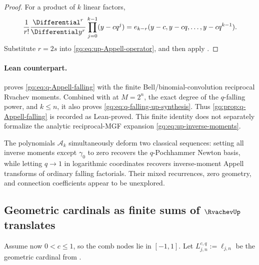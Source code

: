 \begin{proof}
For a product of $k$ linear factors,
\[
 \frac1{r!}\frac{\Differential^r}{\Differential y^r}
 \prod_{j=0}^{k-1}(y-cq^j)
 =e_{k-r}(y-c,y-cq,\ldots,y-cq^{k-1}).
\]
Substitute $r=2s$ into \eqref{gq:eq:up-Appell-operator}, and then apply
.
\end{proof}

\paragraph{Lean counterpart.}
 proves
\eqref{gq:eq:q-Appell-falling} with the finite Bell/binomial-convolution
reciprocal Rvachev moments.  Combined with
at $M=2^n$, the exact degree of the $q$-falling power, and $k\le n$, it also
proves \eqref{gq:eq:q-falling-up-synthesis}.  Thus
\cref{gq:prop:q-Appell-falling} is recorded as Lean-proved.  This finite
identity does not separately formalize the analytic reciprocal-MGF expansion
\eqref{gq:eq:up-inverse-moments}.

The polynomials $\mathscr A_k$ simultaneously deform two classical
sequences: setting all inverse moments except $\gamma_0$ to zero recovers the
$q$-Pochhammer Newton basis, while letting $q\to1$ in logarithmic coordinates
recovers inverse-moment Appell transforms of ordinary falling factorials.
Their mixed recurrences, zero geometry, and connection coefficients appear
to be unexplored.

\subsection{Geometric cardinals as finite sums of \texorpdfstring{$\RvachevUp$}{up} translates}
\label{gq:sec:geometric-cardinal-up}

Assume now $0<c\le1$, so the comb nodes lie in $[-1,1]$.  Let
$L_{j,n}^{c,q}:=\ell_{j,n}$ be the geometric cardinal from .

